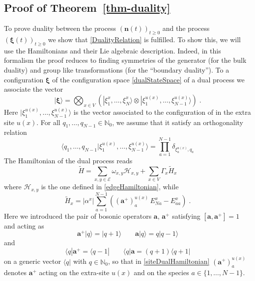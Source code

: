 \documentclass[10pt]{article}
\numberwithin{equation}{section}
\numberwithin{equation}{subsection}
\newcommand{\dt}{\;.}
\begin{document}
\subsection{Proof of Theorem~\ref{thm-duality}}
\label{proof-th-duality}
To prove duality between the process $(\bm{n}(t))_{t\geq 0}$ and the process  $(\bm{\xi}(t))_{t\geq 0}$ we  show that \eqref{DualityRelation} is fulfilled.  To show this, we will use the Hamiltonians and their Lie algebraic description. Indeed, in this formalism the proof
reduces to finding symmetries of the generator (for the bulk duality) and group like transformations (for the ``boundary duality'').
To a configuration $\bm{\xi}$ of the configuration space  \eqref{dualStateSpace} of a dual process we associate the vector
\begin{equation}
    |\bm{\xi}\rangle=\bigotimes_{x\in V}\left(|\xi_{1}^{x},\ldots,\xi_{N}^{x}\rangle\otimes |\xi_{1}^{u(x)},\ldots,\xi_{N-1}^{u(x)}\rangle\right)\dt
\end{equation}
{\color{blue} Here $|\xi_{1}^{u(x)},\ldots,\xi_{N-1}^{u(x)}\rangle$ is the vector associated to the configuration of in the extra site $u(x)$.  For all $q_{1},\ldots,q_{N-1}\in \mathbb{N}_{0}$, we assume that it satisfy an orthogonality relation
\begin{equation}\label{ortho-extraSite}
	\langle q_{1},\ldots,q_{N-1}|\xi_{1}^{u(x)},\ldots,\xi_{N-1}^{u(x)}\rangle=\prod_{a=1}^{N-1}\delta_{\xi_{a}^{u(x)},q_{a}}
\end{equation} }
The Hamiltonian of the dual process reads
\begin{equation}\label{DualHamiltonian}
    \widetilde{H}=\sum_{x,y\in \mathcal{E}}\omega_{x,y}\mathcal{H}_{x,y}+\sum_{x\in V}\Gamma_{x}\widetilde{H}_{x}
\end{equation}
where $\mathcal{H}_{x,y}$ is the one defined in \eqref{edgeHamiltonian}, while 
\begin{equation}\label{siteDualHamiltonian}
    \widetilde{H}_{x}=|\alpha^{x}|\sum_{a=1}^{N-1}\left((\mathbf{a}^{+})_{a}^{u(x)}\,E_{Na}^{x}-E_{aa}^{x}\right)\dt
\end{equation}
Here we introduced the pair of bosonic operators $\mathbf{a},\,\mathbf{a}^{+}$ satisfying $[\mathbf{a},\mathbf{a}^{+}]=1$ and acting as
\begin{equation}
	\mathbf{a}^{+}|q\rangle=|q+1\rangle\qquad \mathbf{a}|q\rangle=q|q-1\rangle
\end{equation}
and 
\begin{equation}\label{bosonic_2}
	\langle q|\mathbf{a}^{+}=\langle q-1|\qquad \langle q|\mathbf{a}=(q+1) \langle q+1|
\end{equation}
on a generic vector $\langle q|$ with $q\in \mathbb{N}_{0}$, so that in \eqref{siteDualHamiltonian} 
$(\mathbf{a}^{+})_{a}^{u(x)}$ denotes  $\mathbf{a}^{+}$ acting on the extra-site $u(x)$ and on the species $a\in\{1,\ldots,N-1\}$. \\
\end{document}
